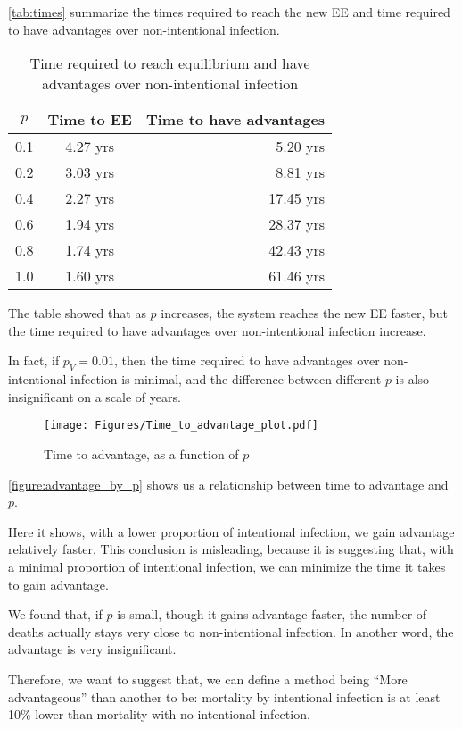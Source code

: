 \documentclass[12pt]{article}
\newcommand{\pmV}{p_{V}}
\begin{document}
\autoref{tab:times} summarize the times required to reach the new EE and time required to have advantages over non-intentional infection.

\begin{table}[H]
\begin{center}
\caption{Time required to reach equilibrium and have advantages over non-intentional infection}
\label{tab:times}
\smallskip
\begin{tabular}{c|c|r}
{\bfseries $p$} & {\bfseries Time to EE} & {\bfseries Time to have advantages} \\\hline
0.1 & 4.27 yrs & 5.20 yrs \\
0.2 & 3.03 yrs & 8.81 yrs \\
0.4 & 2.27 yrs & 17.45 yrs \\
0.6 & 1.94 yrs & 28.37 yrs \\
0.8 & 1.74 yrs & 42.43 yrs \\
1.0 & 1.60 yrs & 61.46 yrs
\end{tabular}
\end{center}
\end{table}
The table showed that as $p$ increases, the system reaches the new EE faster, but the time required to have advantages over non-intentional infection increase.

In fact, if $\pmV=0.01$, then the time required to have advantages over non-intentional infection is minimal, and the difference between different $p$ is also insignificant on a scale of years.

\begin{figure}[H]
  \centering
  \texttt{[image: Figures/Time\_to\_advantage\_plot.pdf]}
  \caption{Time to advantage, as a function of $p$}
\label{figure:advantage_by_p}
\end{figure}

\autoref{figure:advantage_by_p} shows us a relationship between time to advantage and $p$.

Here it shows, with a lower proportion of intentional infection, we gain advantage relatively faster. This conclusion is misleading, because it is suggesting that, with a minimal proportion of intentional infection, we can minimize the time it takes to gain advantage.

We found that, if $p$ is small, though it gains advantage faster, the number of deaths actually stays very close to non-intentional infection. In another word, the advantage is very insignificant.

Therefore, we want to suggest that, we can define a method being ``More advantageous'' than another to be: mortality by intentional infection is at least 10\% lower than mortality with no intentional infection.
\end{document}
